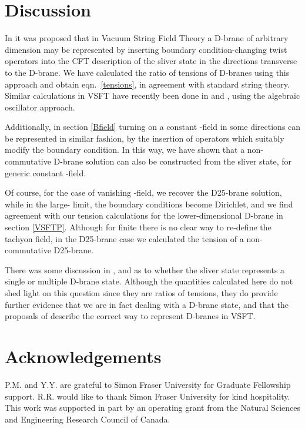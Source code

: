 \documentclass[letterpaper,12pt]{article}
\def\er#1{eqn.~\eqref{#1}}
\begin{document}
\section{Discussion}
\label{discuss}

In \cite{RSZ4} it was proposed that in Vacuum String Field Theory a D-brane of arbitrary dimension may be represented 
by inserting boundary condition-changing twist operators into the CFT
description of the sliver state in the directions transverse to the D-brane.
We have calculated the ratio of tensions of D-branes using this approach and obtain
\er{tensions},  in agreement with standard string theory. Similar calculations
in VSFT have recently been done in \cite{BMM} and \cite{Okuyama}, using the
algebraic oscillator approach.

Additionally, in section \ref{Bfield} turning on a constant \coordHE{}-field in some directions can be represented
in similar fashion, by the insertion of operators \myHighlight{$\beta^\pm$}\coordHE{} which suitably
modify the boundary condition. In this way, we have shown that a non-commutative D-brane
solution can also be constructed from the sliver state, for generic constant \coordHE{}-field.

Of course, for the case of vanishing \coordHE{}-field, we recover the D25-brane solution, while
in the large-\coordHE{} limit, the boundary conditions become Dirichlet, and we find agreement
with our tension calculations for the lower-dimensional D-brane in section \ref{VSFTP}.
Although for finite \coordHE{} there is no clear way to re-define the tachyon field, in
the D25-brane case we calculated the tension of a non-commutative D25-brane.

There was some discussion in \cite{HK}, \cite{RSZ6} and \cite{RV} as to whether the sliver state
represents a single or multiple D-brane state. Although the quantities calculated here do not
shed light on this question since they are ratios of tensions, they 
do provide further evidence that we are in fact dealing with a D-brane state,
and that the proposals of \cite{RSZ4} describe the correct way to represent
D-branes in VSFT.


\section*{\small Acknowledgements }
P.M. and Y.Y. are grateful to Simon Fraser University for Graduate Fellowship support.
R.R. would like to thank Simon Fraser University for kind hospitality.
This work was supported in part by an operating grant from the
Natural Sciences and Engineering Research Council of Canada.
\end{document}
